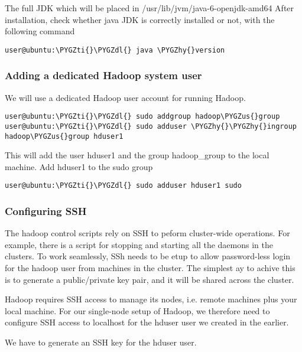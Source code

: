 \documentclass[letterpaper,10pt,english]{sphinxmanual}
\def\PYGZus{\char`\_}
\def\PYGZdl{\char`\$}
\def\PYGZhy{\char`\-}
\def\PYGZti{\char`\~}
\begin{document}
The full JDK which will be placed in /usr/lib/jvm/java-6-openjdk-amd64
After installation, check whether java JDK is correctly installed or not, with the following command

\begin{Verbatim}[commandchars=\\\{\}]
user@ubuntu:\PYGZti{}\PYGZdl{} java \PYGZhy{}version
\end{Verbatim}


\subsubsection{Adding a dedicated Hadoop system user}
\label{hadoop:adding-a-dedicated-hadoop-system-user}
We will use a dedicated Hadoop user account for running Hadoop.

\begin{Verbatim}[commandchars=\\\{\}]
user@ubuntu:\PYGZti{}\PYGZdl{} sudo addgroup hadoop\PYGZus{}group
user@ubuntu:\PYGZti{}\PYGZdl{} sudo adduser \PYGZhy{}\PYGZhy{}ingroup hadoop\PYGZus{}group hduser1
\end{Verbatim}

This will add the user hduser1 and the group hadoop\_group to the local machine.
Add hduser1 to the sudo group

\begin{Verbatim}[commandchars=\\\{\}]
user@ubuntu:\PYGZti{}\PYGZdl{} sudo adduser hduser1 sudo
\end{Verbatim}


\subsubsection{Configuring SSH}
\label{hadoop:configuring-ssh}
The hadoop control scripts rely on SSH to peform cluster-wide operations. For example, there is a script for stopping and starting all the daemons in the clusters. To work seamlessly, SSh needs to be etup to allow password-less login for the hadoop user from machines in the cluster. The simplest ay to achive this is to generate a public/private key pair, and it will be shared across the cluster.

Hadoop requires SSH access to manage its nodes, i.e. remote machines plus your local machine. For our single-node setup of Hadoop, we therefore need to configure SSH access to localhost for the hduser user we created in the earlier.

We have to generate an SSH key for the hduser user.
\end{document}
